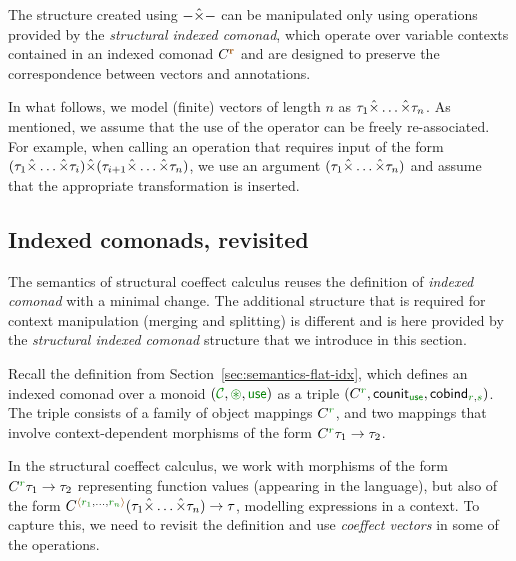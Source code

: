 The structure created using $-\hat{\times}-$ can be manipulated only using operations provided by
the \emph{structural indexed comonad}, which operate over variable contexts contained in an
indexed comonad $\ctyp{\aclrd{\textbf{r}}}$ and are designed to preserve the correspondence
between vectors and annotations.

In what follows, we model (finite) vectors of length $n$ as $\tau_1 \hat{\times} \ldots \hat{\times} \tau_n$.
As mentioned, we assume that the use of the operator can be freely re-associated. For example, when
calling an operation that requires input of the form
$(\tau_1 \hat{\times} \ldots \hat{\times} \tau_i) \hat{\times} (\tau_{i+1} \hat{\times} \ldots \hat{\times} \tau_n)$,
we use an argument $(\tau_1 \hat{\times} \ldots \hat{\times} \tau_n)$ and assume that the
appropriate transformation is inserted.


\subsection{Indexed comonads, revisited}

The semantics of structural coeffect calculus reuses the definition of \emph{indexed comonad} with
a minimal change. The additional structure that is required for context manipulation (merging and
splitting) is different and is here provided by the \emph{structural indexed comonad} structure that
we introduce in this section.

Recall the definition from Section~\ref{sec:semantics-flat-idx}, which defines an indexed como\-nad
over a monoid $(\C, \cseq, \cunit)$ as a triple $(\ctyp{\cclrd{r}{}}, \ident{counit}_{\cunit},
\ident{cobind}_{\cclrd{r}, \cclrd{s}})$. The triple consists of a family of object mappings $\ctyp{\cclrd{r}{}}$,
and two mappings that involve context-dependent morphisms of the form $\ctyp{\cclrd{r}} \tau_1 \rightarrow \tau_2$.

In the structural coeffect calculus, we work with morphisms of the form $\ctyp{\cclrd{r}} \tau_1 \rightarrow \tau_2$
representing function values (appearing in the language), but also of the form
$\ctyp{\alift{\cclrd{r_1},\ldots,\cclrd{r_n}}}{(\tau_1 \xtimes \ldots \xtimes \tau_n)} \rightarrow \tau$,
modelling expressions in a context. To capture this, we need to revisit the definition and use
\emph{coeffect vectors} in some of the operations.


